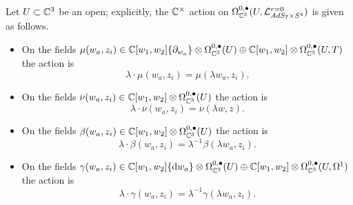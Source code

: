 %
%
%
%

Let $U\subset \mathbb{C}^3$ be an open; explicitly, the $\mathbb{C}^\times$ action on $\Omega^{0,\bullet}_{\mathbb{C}^3} (U, \mathcal{L}^{{r=0}}_{AdS_7\times S^4} )$ is given as follows.
\begin{itemize}
\item On the fields $\mu(w_a,z_i) \in \mathbb{C}[w_1, w_2]\{\partial_{w_a}\} \otimes \Omega^{0,\bullet}_{\mathbb{C}^3} (U) \oplus \mathbb{C}[w_1, w_2]\otimes \Omega^{0,\bullet}_{\mathbb{C}^3}(U, T)$ the action is
\[
\lambda \cdot \mu(w_a,z_i) = \mu(\lambda w_a , z_i).
\]
\item On the fields $\nu(w_a,z_i) \in \mathbb{C}[w_1, w_2] \otimes \Omega^{0,\bullet}_{\mathbb{C}^3}(U)$ the action is
\[
\lambda \cdot \nu(w_a,z_i) = \nu(\lambda w , z).
\]
\item On the fields $\beta(w_a,z_i) \in \mathbb{C}[w_1, w_2] \otimes \Omega^{0,\bullet}_{\mathbb{C}^3}(U)$ the action is
\[
\lambda \cdot \beta(w_a,z_i) = \lambda^{-1} \beta(\lambda w_a , z_i).
\]
\item On the fields $\gamma(w_a,z_i) \in \mathbb{C}[w_1, w_2] \{\mathrm{d} w_a\} \otimes \Omega^{0,\bullet}_{\mathbb{C}^3} (U) \oplus \mathbb{C}[w_1, w_2]\otimes \Omega^{0,\bullet}_{\mathbb{C}^3}(U, \Omega^1)$ the action is
\[
\lambda \cdot \gamma(w_a,z_i) = \lambda^{-1} \gamma(\lambda w _a, z_i).
\]
\end{itemize}

